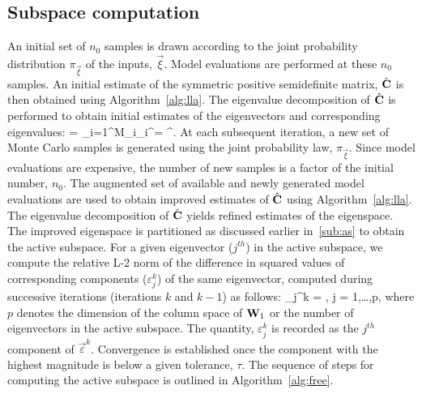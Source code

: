 \subsection{Subspace computation}
\label{sub:subspace} 

An initial set of $n_0$ samples is drawn according to the joint probability distribution
$\pi_{\vec{\xi}}$ of the inputs, $\vec{\xi}$. Model evaluations are performed at these
$n_0$ samples. 
An initial estimate of the symmetric positive semidefinite matrix, $\hat{\mathbf{{C}}}$ 
is then obtained using Algorithm~\ref{alg:lla}. The eigenvalue decomposition of 
$\hat{\mathbf{{C}}}$ is performed to obtain initial estimates of the eigenvectors and
corresponding eigenvalues:
%
\be
{} = \sum\limits_{i=1}^{M}_i_i^\top = \hat{\bm{\Lambda}}^\top.
\ee
%
At each subsequent iteration, a new set of Monte Carlo samples is generated using the joint 
probability law, $\pi_{\vec{\xi}}$. Since model evaluations are expensive, the number of new samples
is a factor of the initial number, $n_0$. The augmented set of available and newly generated model
evaluations are used to obtain improved estimates of $\hat{\mathbf{{C}}}$ using Algorithm~\ref{alg:lla}.
The eigenvalue decomposition of $\hat{\mathbf{{C}}}$ yields refined estimates of the eigenspace.
The improved eigenspace is partitioned as discussed earlier in~\ref{sub:as}
 to obtain the active subspace. For a given eigenvector ($j^{th}$) in the active subspace, 
 we compute the relative L-2 
 norm of the difference in squared values of corresponding components ($\varepsilon_j^k$) of the same eigenvector,
 computed during successive iterations (iterations $k$ and $k-1$) as follows:
%
\be
\varepsilon_j^k = , 
                       j = 1,\ldots,p,
\label{eq:conv}
\ee
%
where $p$ denotes the dimension of the column space of $\mathbf{{W}}_1$ or the number of eigenvectors in
the active subspace.
The quantity, $\varepsilon_j^k$ is recorded as the $j^{th}$ component of $\vec\varepsilon^k$. Convergence is
established once the component with the highest magnitude is below a given tolerance, $\tau$. 
The sequence of steps for computing the active subspace is outlined
in Algorithm~\ref{alg:free}.
%
\bigskip
